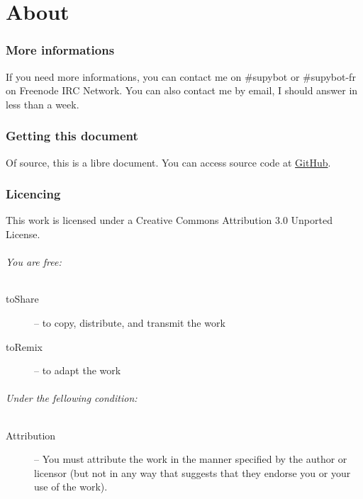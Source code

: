 \documentclass[a4paper,11pt]{article}
\begin{document}
    


    
\clearpage
\newpage
\part*{About}
  \section*{More informations}
    If you need more informations, you can contact me on \mbox{\#supybot} or
    \mbox{\#supybot-fr} on Freenode IRC Network.
    You can also contact me by email, I should answer in less than a week.
  
  \section*{Getting this document}
    Of source, this is a libre document. You can access source code at
    \href{https://github.com/ProgVal/Supybot-docs}{GitHub}.
  
  \section*{Licencing}
    This work is licensed under a Creative Commons Attribution 3.0 Unported License.
    \paragraph{You are free:}
      \begin{description}
        \item[toShare] -- to copy, distribute, and transmit the work
        \item[toRemix] -- to adapt the work
      \end{description}

    \paragraph{Under the fellowing condition:}
      \begin{description}
        \item[Attribution] -- You must attribute the work in the
manner specified by the author or licensor (but not in any way that suggests
that they endorse you or your use of the work). 
        
      \end{description}
\end{document}
